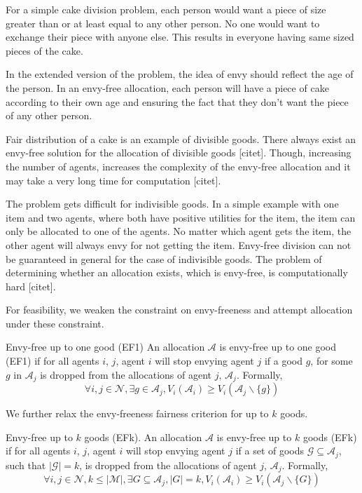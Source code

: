 For a simple cake division problem, each person would want a piece of size greater than or at least equal to any other person. No one would want to exchange their piece with anyone else. This results in everyone having same sized pieces of the cake.

In the extended version of the problem, the idea of envy should reflect the age of the person. In an envy-free allocation, each person will have a piece of cake according to their own age and ensuring the fact that they don't want the piece of any other person. 

Fair distribution of a cake is an example of divisible goods. There always exist an envy-free solution for the allocation of divisible goods [citet]. Though, increasing the number of agents, increases the complexity of the envy-free allocation and it may take a very long time for computation [citet].

The problem gets difficult for indivisible goods. In a simple example with one item and two agents, where both have positive utilities for the item, the item can only be allocated to one of the agents. No matter which agent gets the item, the other agent will always envy for not getting the item. Envy-free division can not be guaranteed in general for the case of indivisible goods. The problem of determining whether an allocation exists, which is envy-free, is computationally hard [citet].

For feasibility, we weaken the constraint on envy-freeness and attempt allocation under these constraint.

\begin{definition}{Envy-free up to one good (EF1) \cite{caragiannis2016unreasonable}}
\label{def_ef1}
An allocation $\mathcal{A}$ is envy-free up to one good (EF1) if for all agents $i$, $j$, agent $i$ will stop envying agent $j$ if a good $g$, for some $g$ in $\mathcal{A}_j$ is dropped from the allocations of agent $j$, $\mathcal{A}_j$. Formally,
$$
    \forall i,j \in \mathcal{N}, \exists g \in \mathcal{A}_j, V_i(\mathcal{A}_i) \geq V_i(\mathcal{A}_j \backslash \{g\})
$$
\end{definition}

We further relax the envy-freeness fairness criterion for up to $k$ goods.

\begin{definition}{Envy-free up to $k$ goods (EFk).}
\label{def_efk}
An allocation $\mathcal{A}$ is envy-free up to $k$ goods (EFk) if for all agents $i$, $j$, agent $i$ will stop envying agent $j$ if a set of goods $\mathcal{G} \subseteq \mathcal{A}_j$, such that $|\mathcal{G}| = k$, is dropped from the allocations of agent $j$, $\mathcal{A}_j$. Formally,
$$
    \forall i,j \in \mathcal{N}, k \leq |\mathcal{M}|, \exists G \subseteq \mathcal{A}_j, |G| = k, V_i(\mathcal{A}_i) \geq V_i(\mathcal{A}_j \backslash \{G\})
$$
\end{definition}

